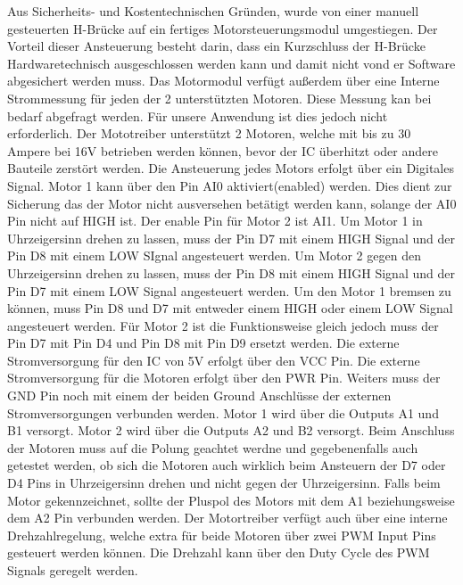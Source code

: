 Aus Sicherheits- und Kostentechnischen Gründen, wurde von einer manuell gesteuerten H-Brücke auf ein fertiges Motorsteuerungsmodul umgestiegen. Der Vorteil dieser Ansteuerung besteht darin, dass ein Kurzschluss der H-Brücke Hardwaretechnisch ausgeschlossen werden kann und damit nicht vond er Software abgesichert werden muss. Das Motormodul verfügt außerdem über eine Interne Strommessung für jeden der 2 unterstützten Motoren. Diese Messung kan bei bedarf abgefragt werden. Für unsere Anwendung ist dies jedoch nicht erforderlich. Der Mototreiber unterstützt 2 Motoren, welche mit bis zu 30 Ampere bei 16V betrieben werden können, bevor der IC überhitzt oder andere Bauteile zerstört werden. Die Ansteuerung jedes Motors erfolgt über ein Digitales Signal. Motor 1 kann über den Pin AI0 aktiviert(enabled) werden. Dies dient zur Sicherung das der Motor nicht ausversehen betätigt werden kann, solange der AI0 Pin nicht auf HIGH ist. Der enable Pin für Motor 2 ist AI1. Um Motor 1 in Uhrzeigersinn drehen zu lassen, muss der Pin D7 mit einem HIGH Signal und der Pin D8 mit einem LOW SIgnal angesteuert werden. Um Motor 2 gegen den Uhrzeigersinn drehen zu lassen, muss der Pin D8 mit einem HIGH Signal und der Pin D7 mit einem LOW Signal angesteuert werden. Um den Motor 1 bremsen zu können, muss Pin D8 und D7 mit entweder einem HIGH oder einem LOW Signal angesteuert werden. Für Motor 2 ist die Funktionsweise gleich jedoch muss der Pin D7 mit Pin D4 und Pin D8 mit Pin D9 ersetzt werden. Die externe Stromversorgung für den IC von 5V erfolgt über den VCC Pin. Die externe Stromversorgung für die Motoren erfolgt über den PWR Pin. Weiters muss der GND Pin noch mit einem der beiden Ground Anschlüsse der externen Stromversorgungen verbunden werden. Motor 1 wird über die Outputs A1 und B1 versorgt. Motor 2 wird über die Outputs A2 und B2 versorgt. Beim Anschluss der Motoren muss auf die Polung geachtet werdne und gegebenenfalls auch getestet werden, ob sich die Motoren auch wirklich beim Ansteuern der D7 oder D4 Pins in Uhrzeigersinn drehen und nicht gegen der Uhrzeigersinn. Falls beim Motor gekennzeichnet, sollte der Pluspol des Motors mit dem A1 beziehungsweise dem A2 Pin verbunden werden. Der Motortreiber verfügt auch über eine interne Drehzahlregelung, welche extra für beide Motoren über zwei PWM Input Pins gesteuert werden können. Die Drehzahl kann über den Duty Cycle des PWM Signals geregelt werden.
